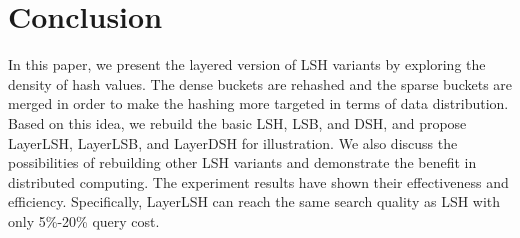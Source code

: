 \vspace{-0.1in}
\section{Conclusion}
\label{sec:conclusion}

In this paper, we present the layered version of LSH variants by exploring the density of hash values. The dense buckets are rehashed and the sparse buckets are merged in order to make the hashing more targeted in terms of data distribution. Based on this idea, we rebuild the basic LSH, LSB, and DSH, and propose LayerLSH, LayerLSB, and LayerDSH for illustration. We also discuss the possibilities of rebuilding other LSH variants and demonstrate the benefit in distributed computing. The experiment results have shown their effectiveness and efficiency. Specifically, LayerLSH can reach the same search quality as LSH with only 5\%-20\% query cost.

